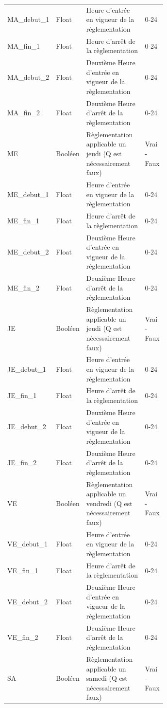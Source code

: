 \begin{longtable}{p{0.15 \linewidth}  l p{0.5\linewidth} l  }
          MA\_debut\_1 & Float & Heure d'entrée en vigueur de la règlementation & 0-24\\
          MA\_fin\_1 & Float & Heure d'arrêt de la règlementation & 0-24\\
          MA\_debut\_2 & Float & Deuxième Heure d'entrée en vigueur de la règlementation & 0-24\\
          MA\_fin\_2 & Float & Deuxième Heure d'arrêt de la règlementation & 0-24 \\
          ME & Booléen & Règlementation applicable un jeudi (Q est nécessairement faux) & Vrai - Faux \\
          ME\_debut\_1 & Float & Heure d'entrée en vigueur de la règlementation & 0-24\\
          ME\_fin\_1 & Float & Heure d'arrêt de la règlementation & 0-24\\
          ME\_debut\_2 & Float & Deuxième Heure d'entrée en vigueur de la règlementation & 0-24\\
          ME\_fin\_2 & Float & Deuxième Heure d'arrêt de la règlementation & 0-24 \\
          JE & Booléen & Règlementation applicable un jeudi (Q est nécessairement faux) & Vrai - Faux \\
          JE\_debut\_1 & Float & Heure d'entrée en vigueur de la règlementation & 0-24\\
          JE\_fin\_1 & Float & Heure d'arrêt de la règlementation & 0-24\\
          JE\_debut\_2 & Float & Deuxième Heure d'entrée en vigueur de la règlementation & 0-24\\
          JE\_fin\_2 & Float & Deuxième Heure d'arrêt de la règlementation & 0-24 \\
          VE & Booléen & Règlementation applicable un vendredi (Q est nécessairement faux) & Vrai - Faux\\
          VE\_debut\_1 & Float & Heure d'entrée en vigueur de la règlementation & 0-24\\
          VE\_fin\_1 & Float & Heure d'arrêt de la règlementation & 0-24\\
          VE\_debut\_2 & Float & Deuxième Heure d'entrée en vigueur de la règlementation & 0-24\\
          VE\_fin\_2 & Float & Deuxième Heure d'arrêt de la règlementation & 0-24 \\
          SA & Booléen & Règlementation applicable un samedi (Q est nécessairement faux) & Vrai - Faux \\

\end{longtable}
